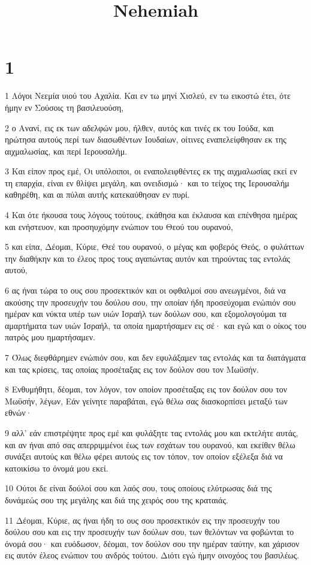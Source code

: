 

\title{Nehemiah}


\chapter{1}

\par 1 Λόγοι Νεεμία υιού του Αχαλία. Και εν τω μηνί Χισλεύ, εν τω εικοστώ έτει, ότε ήμην εν Σούσοις τη βασιλευούση,
\par 2 ο Ανανί, εις εκ των αδελφών μου, ήλθεν, αυτός και τινές εκ του Ιούδα, και ηρώτησα αυτούς περί των διασωθέντων Ιουδαίων, οίτινες εναπελείφθησαν εκ της αιχμαλωσίας, και περί Ιερουσαλήμ.
\par 3 Και είπον προς εμέ, Οι υπόλοιποι, οι εναπολειφθέντες εκ της αιχμαλωσίας εκεί εν τη επαρχία, είναι εν θλίψει μεγάλη, και ονειδισμώ· και το τείχος της Ιερουσαλήμ καθηρέθη, και αι πύλαι αυτής κατεκαύθησαν εν πυρί.
\par 4 Και ότε ήκουσα τους λόγους τούτους, εκάθησα και έκλαυσα και επένθησα ημέρας και ενήστευον, και προσηυχόμην ενώπιον του Θεού του ουρανού,
\par 5 και είπα, Δέομαι, Κύριε, Θεέ του ουρανού, ο μέγας και φοβερός Θεός, ο φυλάττων την διαθήκην και το έλεος προς τους αγαπώντας αυτόν και τηρούντας τας εντολάς αυτού,
\par 6 ας ήναι τώρα το ους σου προσεκτικόν και οι οφθαλμοί σου ανεωγμένοι, διά να ακούσης την προσευχήν του δούλου σου, την οποίαν ήδη προσεύχομαι ενώπιόν σου ημέραν και νύκτα υπέρ των υιών Ισραήλ των δούλων σου, και εξομολογούμαι τα αμαρτήματα των υιών Ισραήλ, τα οποία ημαρτήσαμεν εις σέ· και εγώ και ο οίκος του πατρός μου ημαρτήσαμεν.
\par 7 Όλως διεφθάρημεν ενώπιόν σου, και δεν εφυλάξαμεν τας εντολάς και τα διατάγματα και τας κρίσεις, τας οποίας προσέταξας εις τον δούλον σου τον Μωϋσήν.
\par 8 Ενθυμήθητι, δέομαι, τον λόγον, τον οποίον προσέταξας εις τον δούλον σου τον Μωϋσήν, λέγων, Εάν γείνητε παραβάται, εγώ θέλω σας διασκορπίσει μεταξύ των εθνών·
\par 9 αλλ' εάν επιστρέψητε προς εμέ και φυλάξητε τας εντολάς μου και εκτελήτε αυτάς, και αν ήναι από σας απερριμμένοι έως των εσχάτων του ουρανού, και εκείθεν θέλω συνάξει αυτούς και θέλω φέρει αυτούς εις τον τόπον, τον οποίον εξέλεξα διά να κατοικίσω το όνομά μου εκεί.
\par 10 Ούτοι δε είναι δούλοί σου και λαός σου, τους οποίους ελύτρωσας διά της δυνάμεώς σου της μεγάλης και διά της χειρός σου της κραταιάς.
\par 11 Δέομαι, Κύριε, ας ήναι ήδη το ους σου προσεκτικόν εις την προσευχήν του δούλου σου και εις την προσευχήν των δούλων σου, των θελόντων να φοβώνται το όνομά σου· και ευόδωσον, δέομαι, τον δούλον σου την ημέραν ταύτην, και χάρισον εις αυτόν έλεος ενώπιον του ανδρός τούτου. Διότι εγώ ήμην οινοχόος του βασιλέως.

